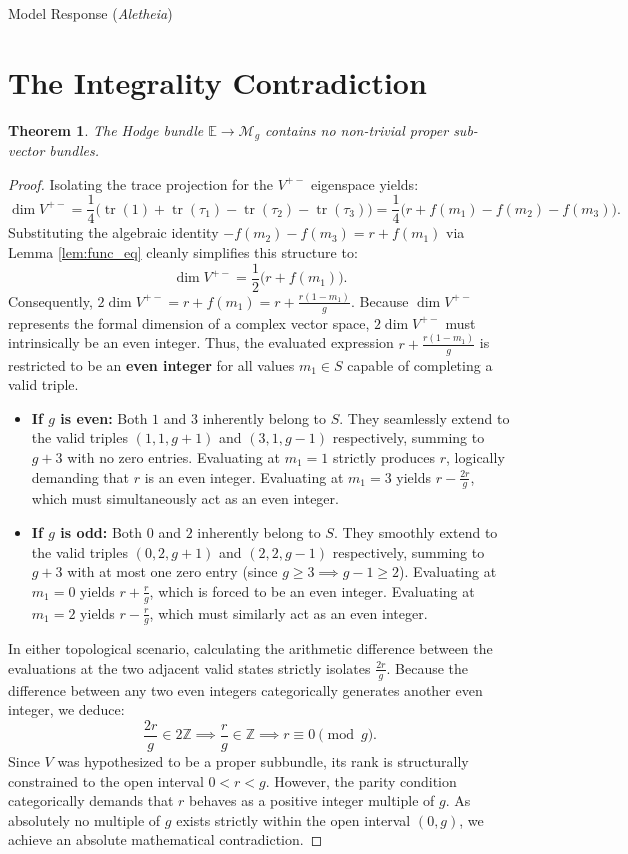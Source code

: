 \documentclass{article}
\theoremstyle{plain}
\newtheorem{theorem}{Theorem}
\theoremstyle{definition}
\newcommand{\Aletheia}{\emph{Aletheia}}
\begin{document}
\begin{solution}{Model Response (\Aletheia)}
\section{The Integrality Contradiction}

\begin{theorem} \label{thm:no_subbundles}
The Hodge bundle $\mathbb{E} \to \mathcal{M}_g$ contains no non-trivial proper sub-vector bundles.
\end{theorem}

\begin{proof}
Isolating the trace projection for the $V^{+-}$ eigenspace yields:
\[ \dim V^{+-} = \frac{1}{4} \big( \operatorname{tr}(1) + \operatorname{tr}(\tau_1) - \operatorname{tr}(\tau_2) - \operatorname{tr}(\tau_3) \big) = \frac{1}{4} \big( r + f(m_1) - f(m_2) - f(m_3) \big). \]
Substituting the algebraic identity $-f(m_2) - f(m_3) = r + f(m_1)$ via Lemma \ref{lem:func_eq} cleanly simplifies this structure to:
\[ \dim V^{+-} = \frac{1}{2} \big( r + f(m_1) \big). \]
Consequently, $2 \dim V^{+-} = r + f(m_1) = r + \frac{r(1-m_1)}{g}$.
Because $\dim V^{+-}$ represents the formal dimension of a complex vector space, $2 \dim V^{+-}$ must intrinsically be an even integer. Thus, the evaluated expression $r + \frac{r(1-m_1)}{g}$ is restricted to be an \textbf{even integer} for all values $m_1 \in S$ capable of completing a valid triple.

\begin{itemize}
    \item \textbf{If $g$ is even:} Both $1$ and $3$ inherently belong to $S$. They seamlessly extend to the valid triples $(1, 1, g+1)$ and $(3, 1, g-1)$ respectively, summing to $g+3$ with no zero entries. Evaluating at $m_1=1$ strictly produces $r$, logically demanding that $r$ is an even integer. Evaluating at $m_1=3$ yields $r - \frac{2r}{g}$, which must simultaneously act as an even integer.

    \item \textbf{If $g$ is odd:} Both $0$ and $2$ inherently belong to $S$. They smoothly extend to the valid triples $(0, 2, g+1)$ and $(2, 2, g-1)$ respectively, summing to $g+3$ with at most one zero entry (since $g \ge 3 \implies g-1 \ge 2$). Evaluating at $m_1=0$ yields $r + \frac{r}{g}$, which is forced to be an even integer. Evaluating at $m_1=2$ yields $r - \frac{r}{g}$, which must similarly act as an even integer.
\end{itemize}

In either topological scenario, calculating the arithmetic difference between the evaluations at the two adjacent valid states strictly isolates $\frac{2r}{g}$. Because the difference between any two even integers categorically generates another even integer, we deduce:
\[ \frac{2r}{g} \in 2\mathbb{Z} \implies \frac{r}{g} \in \mathbb{Z} \implies r \equiv 0 \pmod g. \]
Since $V$ was hypothesized to be a proper subbundle, its rank is structurally constrained to the open interval $0 < r < g$. However, the parity condition categorically demands that $r$ behaves as a positive integer multiple of $g$. As absolutely no multiple of $g$ exists strictly within the open interval $(0, g)$, we achieve an absolute mathematical contradiction.


\end{proof}
\end{solution}
\end{document}
